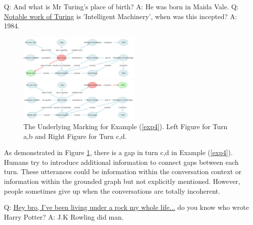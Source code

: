 \documentclass[bsc,frontabs,twoside,singlespacing,parskip,deptreport]{infthesis}     %
\begin{document}
\begin{exe}
	\ex
	\label{exp4}

		\begin{xlist}
			\ex \label{exp2q1} Q: And what is Mr Turing's place of birth?
			\ex \label{exp2a1} A: He was born in Maida Vale.
			\ex \label{exp2q2} Q: \underline{Notable work of Turing} is 'Intelligent Machinery', when was this incepted?
			\ex \label{exp2a2} A: 1984.
	\end{xlist}
\end{exe}


\begin{figure}[htbp]
\centering
\begin{minipage}[t]{0.48\textwidth}
\centering
\includegraphics[width=6cm]{alandis2t1.png}
\end{minipage}
\begin{minipage}[t]{0.48\textwidth}
\centering
\includegraphics[width=6cm]{alandis2t2.png}
\end{minipage}
\caption{The Underlying Marking for Example (\ref{exp4}). Left Figure for Turn a,b and Right Figure for Turn c,d.}
\label{fig:exp4fig}
\end{figure}

As demonstrated in Figure \ref{fig:exp4fig}, there is a gap in turn c,d in Example (\ref{exp4}). Humans try to introduce additional information to connect gaps between each turn. These utterances could be information within the conversation context or information within the grounded graph but not explicitly mentioned. However, people sometimes give up when the conversations are totally incoherent.


\begin{exe}
	\ex
	\label{exp5}
		\begin{xlist}
			\ex \label{exp3q1} Q: \underline{Hey bro, I've been living under a rock my whole life...} do you know who wrote Harry Potter?
			\ex \label{exp3a1} A: J.K Rowling did man.
	\end{xlist}
\end{exe}
\end{document}
